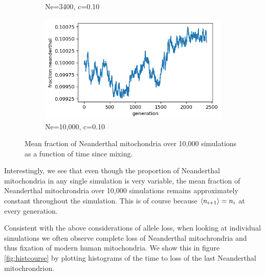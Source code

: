 \documentclass{article}
\begin{document}
\begin{figure}[h]
\begin{subfigure}[t]{0.24\linewidth}
		\caption{Ne=3400, c=0.10}
	\end{subfigure}
	\hspace{0.0\linewidth}
	\begin{subfigure}[t]{0.24\linewidth}
		\centering
		\includegraphics[width = 1.0\linewidth, trim={0 0 0 0}, clip=true]{figures/Ne10000_c1_meann.png}
		\caption{Ne=10,000, c=0.10}
	\end{subfigure}
\caption{Mean fraction of Neanderthal mitochondria over 10,000 simulations as a function of time since mixing.}
\label{fig:simcourse}
\end{figure}

Interestingly, we see that even though the proportion of Neanderthal mitochondria in any single simulation is very variable, the mean fraction of Neanderthal mitochrondria over 10,000 simulations remains approximately constant throughout the simulation. This is of course because $\braket{n_{i+1}} = n_i$ at every generation.

Consistent with the above considerations of allele loss, when looking at individual simulations we often observe complete loss of Neanderthal mitochrondria and thus fixation of modern human mitochondria. We show this in figure \ref{fig:histcourse} by plotting histograms of the time to loss of the last Neanderthal mitochrondrion.
\end{document}
